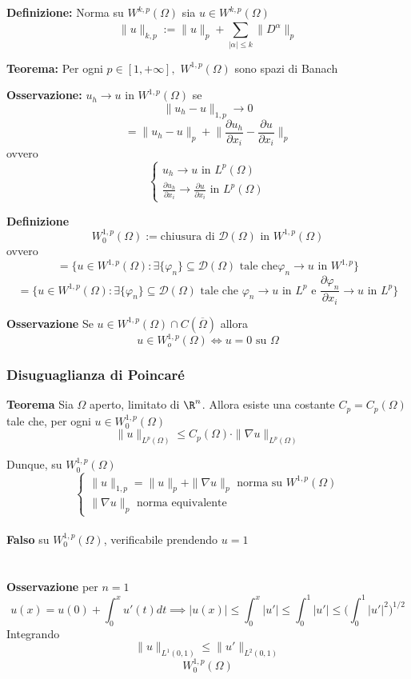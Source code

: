 \begin{tcolorbox}
	\textbf{Definizione:} Norma su $W^{k,p}(\Omega)$ sia $u\in W^{k,p}(\Omega)$ 
	\[\|u\|_{k,p}:=\|u\|_p+\sum_{|\alpha|\le k}^{}\|D^\alpha\|_p \]
\end{tcolorbox}
\begin{tcolorbox}
	\textbf{Teorema: }Per ogni $p\in [1,+\infty],$ $W^{1,p}(\Omega)$ sono spazi di Banach
\end{tcolorbox}
\textbf{Osservazione:} $u_h\to u$ in $W^{1,p}(\Omega)$ se
\[\|u_h-u\|_{1,p}\to 0\]\[=\|u_h-u\|_p+\bigg\| \frac{\partial u_h}{\partial x_i} -\frac{\partial u}{\partial x_i} \bigg\|_p\]
ovvero
\[\begin{cases}
	u_h\to u\text{ in }L^{p}(\Omega)\\
\frac{\partial u_h}{\partial x_i} \to \frac{\partial u}{\partial x_i} \text{ in }L^{p}(\Omega)
\end{cases}\]

\begin{tcolorbox}
\textbf{Definizione}
\[W_0^{1,p}(\Omega):=\text{chiusura di }\mathcal D(\Omega)\text{ in }W^{1,p}(\Omega)\]
ovvero
\[=\{u\in W^{1,p}(\Omega):\exists \{\varphi_n\}\subseteq  \mathcal D(\Omega)\text{ tale che}\varphi_n\to u\text{ in }W^{1,p} \}\]
\[=\{u\in W^{1,p}(\Omega):\exists \{\varphi_n\} \subseteq  \mathcal D(\Omega)\text{ tale che }\varphi_n\to u \text{ in }L^{p}\text{ e }\frac{\partial \varphi_n}{\partial x_i} \to u\text{ in }L^{p}\}\]
\end{tcolorbox}
\textbf{Osservazione} 
Se $u\in W^{1,p}(\Omega)\cap C(\overline\Omega)$ allora 
\[u\in W_o^{1,p}(\Omega) \iff u=0\text{ su }\Omega\]
\subsubsection{Disuguaglianza di Poincaré}
\begin{tcolorbox}
\textbf{Teorema}
Sia $\Omega$ aperto, limitato di $\R^n$. Allora esiste una costante $C_p=C_p(\Omega)$ tale che, per ogni $u\in W_0^{1,p}(\Omega)$ 
\[\|u\|_{L^{p}(\Omega)}\le C_p(\Omega)\cdot \|\nabla u\|_{L^{p}(\Omega)}\]
\end{tcolorbox}

Dunque, su $W_0^{1,p}(\Omega)$
\[\begin{cases}
	\|u\|_{1,p}=\|u\|_p+\|\nabla u\|_p\text{  norma su }W^{1,p}(\Omega)
\\\|\nabla u\|_p\text{  norma equivalente}
\end{cases}\]
\\\textbf{Falso }su $W_0^{1,p}(\Omega)$, verificabile prendendo $u=1$ 
\\\divider\\
\\\textbf{Osservazione} per $n=1$ 
\[u(x)=u(0)+\int_{0}^{x} u'(t)dt\implies |u(x)|\le \int_{0}^{x} |u'|\le \int_{0}^{1} |u'|\le \bigg(\int_{0}^{1} |u'|^2\bigg)^{1 / 2}\]
Integrando 
\[\|u\|_{L^{1}(0,1)}\le \|u'\|_{L^{2}(0,1)}\]
\[W_0^{1,p}(\Omega)\]

